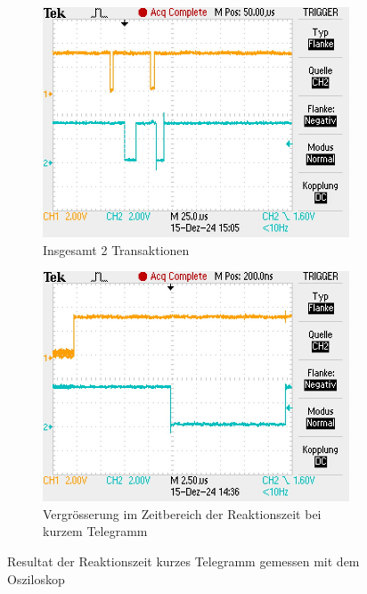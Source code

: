 \begin{figure}[H]
    \centering
    \begin{subfigure}[b]{0.45\textwidth}
        \centering
        \includegraphics[width=\linewidth]{Figures/Chap4/ESP32/Gesammte Transaktion Kurz.JPG} 
        \caption{Insgesamt 2 Transaktionen}
        \label{fig:GesTransKurz}
    \end{subfigure}
    \hfill 
    \begin{subfigure}[b]{0.45\textwidth}
        \centering
        \includegraphics[width=\linewidth]{Figures/Chap4/ESP32/Reaktionszeit Kurz.JPG} 
        \caption{Vergrösserung im Zeitbereich der Reaktionszeit bei kurzem Telegramm}
        \label{fig:ReakKurz}
    \end{subfigure}
    \caption{Resultat der Reaktionszeit kurzes Telegramm gemessen mit dem Osziloskop}
    \label{fig:ResultatOsziReaktionKurz} 
\end{figure}

